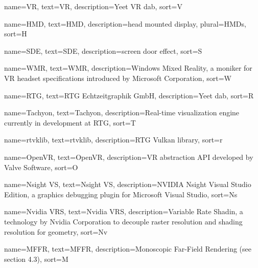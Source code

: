 
{
  name=VR,
  text=VR,
  description={Yeet VR dab}, 
  sort=V
}

{
  name=HMD,
  text=HMD,
  description={head mounted display}, 
  plural=HMDs, 
  sort=H
}

{
  name=SDE,
  text=SDE,
  description={screen door effect}, 
  sort=S
}

{
  name=WMR,
  text=WMR,
  description={Windows Mixed Reality, a moniker for \gls{VR} headset specifications introduced by Microsoft Corporation}, 
  sort=W
}

{
  name=RTG,
  text=RTG Echtzeitgraphik GmbH,
  description={Yeet dab}, 
  sort=R
}

{
  name=Tachyon,
  text=Tachyon,
  description={Real-time visualization engine currently in development at \gls{RTG}}, 
  sort=T
}

{
  name=rtvklib,
  text=rtvklib,
  description={\gls{RTG} Vulkan library}, 
  sort=r
}

{
  name=OpenVR,
  text=OpenVR,
  description={\gls{VR} abstraction API developed by Valve Software}, 
  sort=O
}

{
  name=Nsight VS,
  text=Nsight VS,
  description={NVIDIA Nsight Visual Studio Edition, a graphics debugging plugin for Microsoft Visual Studio\cite{NvidiaCorporation.2013}}, 
  sort=Ns
}

{
  name=Nvidia VRS,
  text=Nvidia VRS,
  description={Variable Rate Shadin, a technology by Nvidia Corporation to decouple raster resolution and shading resolution for geometry\cite{NvidiaCorporation.2018}}, 
  sort=Nv
}

{
  name=MFFR,
  text=MFFR,
  description={Monoscopic Far-Field Rendering (see section 4.3)}, 
  sort=M
}











\iffalse
{}


